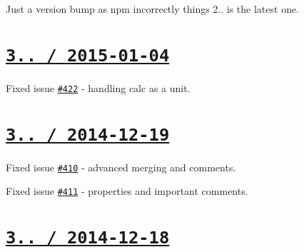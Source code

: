 \begin{DoxyItemize}
\item Just a version bump as npm incorrectly things 2.. is the latest one.
\end{DoxyItemize}

\section*{\href{https://github.com/jakubpawlowicz/clean-css/compare/v3.0.1...v3.0.2}{\tt 3.. / 2015-\/01-\/04} }


\begin{DoxyItemize}
\item Fixed issue \href{https://github.com/jakubpawlowicz/clean-css/issues/422}{\tt \#422} -\/ handling {\ttfamily calc} as a unit.
\end{DoxyItemize}

\section*{\href{https://github.com/jakubpawlowicz/clean-css/compare/v3.0.0...v3.0.1}{\tt 3.. / 2014-\/12-\/19} }


\begin{DoxyItemize}
\item Fixed issue \href{https://github.com/jakubpawlowicz/clean-css/issues/410}{\tt \#410} -\/ advanced merging and comments.
\item Fixed issue \href{https://github.com/jakubpawlowicz/clean-css/issues/411}{\tt \#411} -\/ properties and important comments.
\end{DoxyItemize}

\section*{\href{https://github.com/jakubpawlowicz/clean-css/compare/v2.2.22...v3.0.0}{\tt 3.. / 2014-\/12-\/18} }


